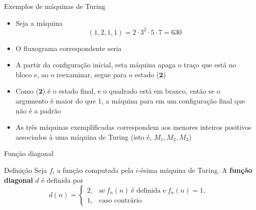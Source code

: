 \begin{frame}[fragile]{Exemplos de máquinas de Turing}

    \begin{itemize}
        \item Seja a máquina 
        \[
            (1, 2, 1, 1) = 2\cdot 3^2\cdot 5\cdot 7 = 630
        \]

        \item O fluxograma correspondente seria

    \begin{figure}[h]
        \centering
    \end{figure}

        \item A partir da configuração inicial, esta máquina apaga o traço que está no bloco e,
            ao o reexaminar, segue para o estado ($\mathbf{2}$)

        \item Como ($\mathbf{2}$) é o estado final, e o quadrado está em branco, então se o 
            argumento é maior do que 1, a máquina para em um configuração final que não é a padrão

        \item As três máquinas exemplificadas correspondem aos menores inteiros positivos 
            associados à uma máquina de Turing (isto é, $M_1, M_2, M_3$)
    \end{itemize}

\end{frame}

\begin{frame}[fragile]{Função diagonal}

    \begin{block}{Definição}
        Seja $f_i$ a função computada pela $i$-ésima máquina de Turing. A \textbf{função diagonal}
        $d$ é definida por
        \[
            d(n) = \left\lbrace \begin{array}{ll}
                2,& \mbox{se}\ f_n(n)\ \mbox{é definida e}\ f_n(n) = 1, \\
                1,& \mbox{caso contrário}
            \end{array}\right.
        \]
    \end{block}

\end{frame}

